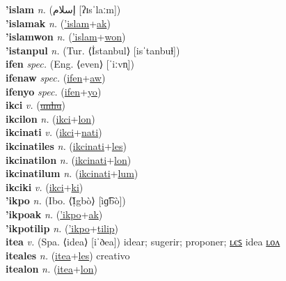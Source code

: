 \textbf{'islam} \textit{n.} ({\arabics{}إسلام} [ʔɪsˈlaːm])
 \label{'islam} \\
\textbf{'islamak} \textit{n.} (\hyperref['islam]{'islam}+\hyperref[ak]{ak})
 \label{'islamak} \\
\textbf{'islamwon} \textit{n.} (\hyperref['islam]{'islam}+\hyperref[won]{won})
 \label{'islamwon} \\
\textbf{'istanpul} \textit{n.} (Tur. ⟨İstanbul⟩ [isˈtanbuɫ])
 \label{'istanpul} \\
\textbf{ifen} \textit{spec.} (Eng. ⟨even⟩ [ˈiːvn̩])
 \label{ifen} \\
\textbf{ifenaw} \textit{spec.} (\hyperref[ifen]{ifen}+\hyperref[aw]{aw})
 \label{ifenaw} \\
\textbf{ifenyo} \textit{spec.} (\hyperref[ifen]{ifen}+\hyperref[yo]{yo})
 \label{ifenyo} \\
\textbf{ikci} \textit{v.} (\hyperref[unhu]{\sout{unhu}})
 \label{ikci} \\
\textbf{ikcilon} \textit{n.} (\hyperref[ikci]{ikci}+\hyperref[lon]{lon})
 \label{ikcilon} \\
\textbf{ikcinati} \textit{v.} (\hyperref[ikci]{ikci}+\hyperref[nati]{nati})
 \label{ikcinati} \\
\textbf{ikcinatiles} \textit{n.} (\hyperref[ikcinati]{ikcinati}+\hyperref[les]{les})
 \label{ikcinatiles} \\
\textbf{ikcinatilon} \textit{n.} (\hyperref[ikcinati]{ikcinati}+\hyperref[lon]{lon})
 \label{ikcinatilon} \\
\textbf{ikcinatilum} \textit{n.} (\hyperref[ikcinati]{ikcinati}+\hyperref[lum]{lum})
 \label{ikcinatilum} \\
\textbf{ikciki} \textit{v.} (\hyperref[ikci]{ikci}+\hyperref[ki]{ki})
 \label{ikciki} \\
\textbf{'ikpo} \textit{n.} (Ibo. ⟨Ị̀gbò⟩ [ìɡ͡bò])
 \label{'ikpo} \\
\textbf{'ikpoak} \textit{n.} (\hyperref['ikpo]{'ikpo}+\hyperref[ak]{ak})
 \label{'ikpoak} \\
\textbf{'ikpotilip} \textit{n.} (\hyperref['ikpo]{'ikpo}+\hyperref[tilip]{tilip})
 \label{'ikpotilip} \\
\textbf{itea} \textit{v.} (Spa. ⟨idea⟩ [iˈðea])
idear; sugerir; proponer; \hyperref[iteales]{ʟєꜱ} idea \hyperref[itealon]{ʟᴏᴧ} \label{itea} \\
\textbf{iteales} \textit{n.} (\hyperref[itea]{itea}+\hyperref[les]{les})
creativo \label{iteales} \\
\textbf{itealon} \textit{n.} (\hyperref[itea]{itea}+\hyperref[lon]{lon})
